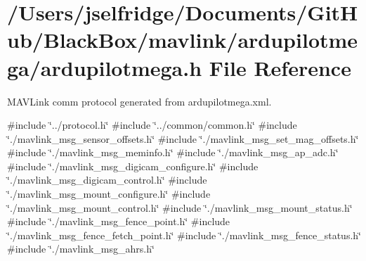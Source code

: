 \section{/\+Users/jselfridge/\+Documents/\+Git\+Hub/\+Black\+Box/mavlink/ardupilotmega/ardupilotmega.h File Reference}
\label{ardupilotmega_8h}


M\+A\+V\+Link comm protocol generated from ardupilotmega.\+xml.  


{\ttfamily \#include \char`\"{}../protocol.\+h\char`\"{}}\newline
{\ttfamily \#include \char`\"{}../common/common.\+h\char`\"{}}\newline
{\ttfamily \#include \char`\"{}./mavlink\+\_\+msg\+\_\+sensor\+\_\+offsets.\+h\char`\"{}}\newline
{\ttfamily \#include \char`\"{}./mavlink\+\_\+msg\+\_\+set\+\_\+mag\+\_\+offsets.\+h\char`\"{}}\newline
{\ttfamily \#include \char`\"{}./mavlink\+\_\+msg\+\_\+meminfo.\+h\char`\"{}}\newline
{\ttfamily \#include \char`\"{}./mavlink\+\_\+msg\+\_\+ap\+\_\+adc.\+h\char`\"{}}\newline
{\ttfamily \#include \char`\"{}./mavlink\+\_\+msg\+\_\+digicam\+\_\+configure.\+h\char`\"{}}\newline
{\ttfamily \#include \char`\"{}./mavlink\+\_\+msg\+\_\+digicam\+\_\+control.\+h\char`\"{}}\newline
{\ttfamily \#include \char`\"{}./mavlink\+\_\+msg\+\_\+mount\+\_\+configure.\+h\char`\"{}}\newline
{\ttfamily \#include \char`\"{}./mavlink\+\_\+msg\+\_\+mount\+\_\+control.\+h\char`\"{}}\newline
{\ttfamily \#include \char`\"{}./mavlink\+\_\+msg\+\_\+mount\+\_\+status.\+h\char`\"{}}\newline
{\ttfamily \#include \char`\"{}./mavlink\+\_\+msg\+\_\+fence\+\_\+point.\+h\char`\"{}}\newline
{\ttfamily \#include \char`\"{}./mavlink\+\_\+msg\+\_\+fence\+\_\+fetch\+\_\+point.\+h\char`\"{}}\newline
{\ttfamily \#include \char`\"{}./mavlink\+\_\+msg\+\_\+fence\+\_\+status.\+h\char`\"{}}\newline
{\ttfamily \#include \char`\"{}./mavlink\+\_\+msg\+\_\+ahrs.\+h\char`\"{}}\newline
